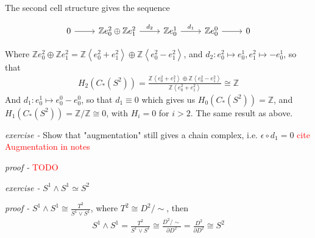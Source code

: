 \documentclass[11pt]{article}
\theoremstyle{definition}
\newcommand{\gen}[1]{\left\langle #1 \right\rangle}
\begin{document}
    The second cell structure gives the sequence

    \begin{equation*}
        \begin{tikzcd}
            0 \arrow[r] & \mathbb{Z}e_0^2 \oplus \mathbb{Z}e_1^2 \arrow[r,"{d_2}"] & \mathbb{Z}e_0^1 \arrow[r,"{d_1}"] & \mathbb{Z}e_0^0 \arrow[r] & 0
        \end{tikzcd}
    \end{equation*}

    Where \(\mathbb{Z}e_0^2 \oplus \mathbb{Z}e_1^2 = \mathbb{Z}\gen{e_0^2 + e_1^2} \oplus \mathbb{Z}\gen{e_0^2 - e_1^2}\), and \(d_2: e_0^2 \mapsto e_0^1, e_1^2 \mapsto -e_0^1\), so that
    \begin{align*}
        H_2(C_*(S^2)) = \frac{\mathbb{Z}\gen{e_0^2 + e_1^2} \oplus \mathbb{Z}\gen{e_0^2 - e_1^2}}{\mathbb{Z}\gen{e_0^2 + e_1^2}} \cong \mathbb{Z}
    \end{align*}
    And \(d_1: e_0^1 \mapsto e_0^0 - e_0^0\), so that \(d_1 \equiv 0\) which gives us \(H_0(C_*(S^2)) = \mathbb{Z}\), and \(H_1(C_*(S^2)) = \mathbb{Z}/\mathbb{Z} \cong 0\), with \(H_i = 0\) for \(i > 2\). The same result as above.
    




    \emph{exercise - }\label{HEx6} Show that "augmentation" still gives a chain complex, i.e. \(\epsilon\circ d_1 = 0\) \textcolor{red}{cite Augmentation in notes}

    \emph{proof - }\textcolor{red}{TODO}


    \emph{exercise - }\label{HEx7} \(S^1 \wedge S^1 \simeq S^2\)

    \emph{proof - } \(S^1 \wedge S^1 \cong \frac{T^2}{S^1 \vee S^1}\), where \(T^2 \cong D^2/\sim\), then
    \begin{align*}
        S^1 \wedge S^1 = \frac{T^2}{S^1 \vee S^1} \cong \frac{D^2/\sim}{\partial D^2} = \frac{D^2}{\partial D^2} \cong S^2
    \end{align*}

\end{document}
